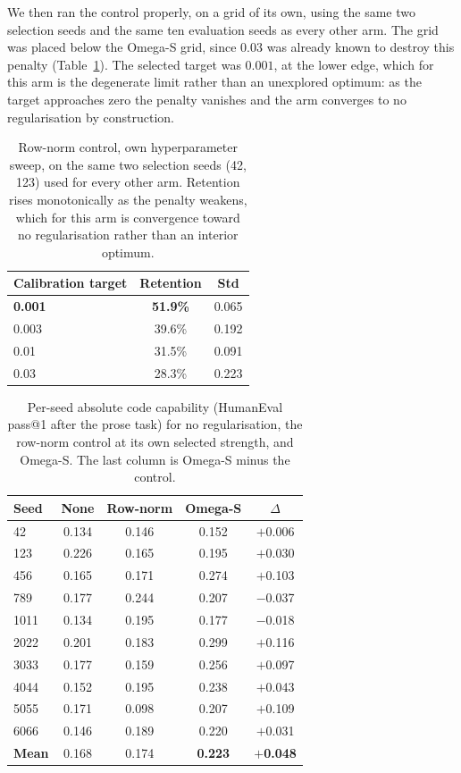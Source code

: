 \documentclass[11pt,a4paper]{article}
\begin{document}
We then ran the control properly, on a grid of its own, using the same two
selection seeds and the same ten evaluation seeds as every other arm. The grid
was placed below the Omega-S grid, since $0.03$ was already known to destroy
this penalty (Table~\ref{tab:rnsweep}). The selected target was $0.001$, at the
lower edge, which for this arm is the degenerate limit rather than an
unexplored optimum: as the target approaches zero the penalty vanishes and the
arm converges to no regularisation by construction.

\begin{table}[h]
\centering
\caption{Row-norm control, own hyperparameter sweep, on the same two selection
seeds (42, 123) used for every other arm. Retention rises monotonically as the
penalty weakens, which for this arm is convergence toward no regularisation
rather than an interior optimum.}
\label{tab:rnsweep}
\small
\begin{tabular}{lcc}
\toprule
Calibration target & Retention & Std \\
\midrule
\textbf{0.001} & \textbf{51.9\%} & 0.065 \\
0.003 & 39.6\% & 0.192 \\
0.01  & 31.5\% & 0.091 \\
0.03  & 28.3\% & 0.223 \\
\bottomrule
\end{tabular}
\end{table}

\begin{table}[h]
\centering
\caption{Per-seed absolute code capability (HumanEval pass@1 after the prose
task) for no regularisation, the row-norm control at its own selected strength,
and Omega-S. The last column is Omega-S minus the control.}
\label{tab:rnperseed}
\small
\begin{tabular}{lcccc}
\toprule
Seed & None & Row-norm & Omega-S & $\Delta$ \\
\midrule
42   & 0.134 & 0.146 & 0.152 & $+$0.006 \\
123  & 0.226 & 0.165 & 0.195 & $+$0.030 \\
456  & 0.165 & 0.171 & 0.274 & $+$0.103 \\
789  & 0.177 & 0.244 & 0.207 & $-$0.037 \\
1011 & 0.134 & 0.195 & 0.177 & $-$0.018 \\
2022 & 0.201 & 0.183 & 0.299 & $+$0.116 \\
3033 & 0.177 & 0.159 & 0.256 & $+$0.097 \\
4044 & 0.152 & 0.195 & 0.238 & $+$0.043 \\
5055 & 0.171 & 0.098 & 0.207 & $+$0.109 \\
6066 & 0.146 & 0.189 & 0.220 & $+$0.031 \\
\midrule
\textbf{Mean} & 0.168 & 0.174 & \textbf{0.223} & \textbf{$+$0.048} \\
\bottomrule
\end{tabular}
\end{table}
\end{document}
